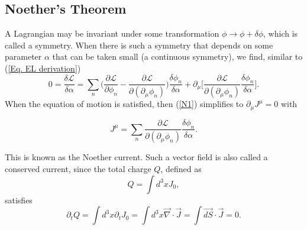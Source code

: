 \documentclass[11pt]{article}
\theoremstyle{definition}
\begin{document}
\subsection{Noether's Theorem}
A Lagrangian may be invariant under some transformation $\phi \rightarrow \phi + \delta\phi$, which is called a symmetry. When there is such a symmetry that depends on some parameter $\alpha$ that can be taken small (a continuous symmetry), we find, similar to (\ref{Eq. EL derivation})
\begin{equation}
    0 = \frac{\delta \mathcal{L}}{\delta \alpha} = \sum _n \biggr(\frac{\partial\mathcal{L}}{\partial \phi_n} - \frac{\partial\mathcal{L}}{\partial(\partial_\mu\phi_n)}\biggr)\frac{\delta\phi_n}{\delta\alpha}  + \partial_\mu\biggr[\frac{\partial\mathcal{L}}{\partial(\partial_\mu\phi_n)}\frac{\delta\phi_n}{\delta\alpha}\biggr].
    \label{N1}
\end{equation}
When the equation of motion is satisfied, then (\ref{N1}) simplifies to $\partial_
\mu J^\mu = 0$ with
\begin{shaded}
\begin{equation}
    J^\mu = \sum_n \frac{\partial\mathcal{L}}{\partial(\partial_\mu\phi_n)}\frac{\delta\phi_n}{\delta\alpha}.
\end{equation}
\end{shaded}
This is known as the Noether current.
Such a vector field is also called a conserved current, since the total charge $Q$, defined as 
\begin{equation}
    Q = \int d^3xJ_0,
\end{equation}
satisfies
\begin{equation}
    \partial_tQ = \int d^3x\partial_tJ_0 = \int d^3x\vec{\nabla}\cdot\vec{J} = \int \vec{dS}\cdot\vec{J} = 0.
\end{equation}
\end{document}
